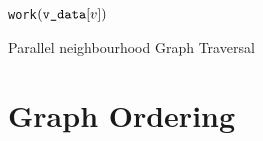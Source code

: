 \begin{algorithm}
    \begin{algorithmic}[1]
            \State \texttt{work}$(\texttt{v\_data}{}[v])$
            \EndFor
        \EndParFor
        
    \end{algorithmic}
    \caption{Parallel neighbourhood Graph Traversal}
    \label{alg:par_graph_traverse}
\end{algorithm}



\section{Graph Ordering}


